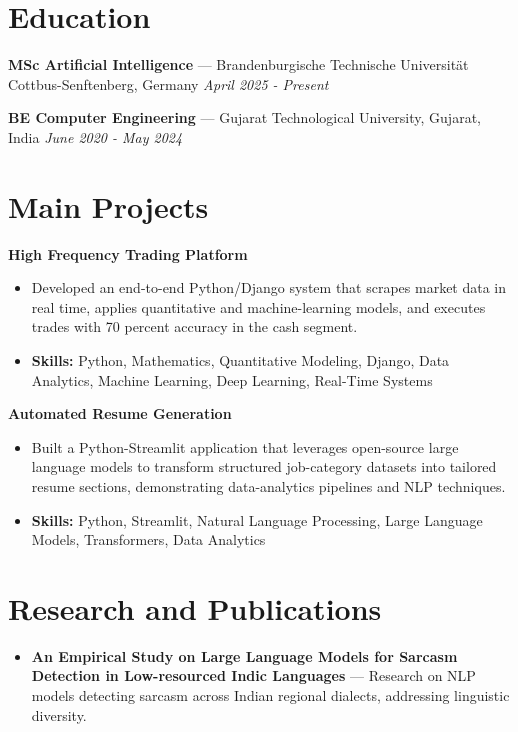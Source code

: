 \documentclass[a4paper,10pt]{article}
\begin{document}
\section*{Education}
\textbf{MSc Artificial Intelligence} — Brandenburgische Technische Universität Cottbus-Senftenberg, Germany \hfill \textit{April 2025 - Present}\par
\vspace{1.5pt}
\textbf{BE Computer Engineering} — Gujarat Technological University, Gujarat, India \hfill \textit{June 2020 - May 2024}\par

\section*{Main Projects}
\textbf{High Frequency Trading Platform}\par
\vspace{1pt}
\begin{itemize}
  \item Developed an end-to-end Python/Django system that scrapes market data in real time, applies quantitative and machine-learning models, and executes trades with 70 percent accuracy in the cash segment.
  \item \textbf{Skills:} Python, Mathematics, Quantitative Modeling, Django, Data Analytics, Machine Learning, Deep Learning, Real-Time Systems
\end{itemize}
\vspace{3pt}
\textbf{Automated Resume Generation}\par
\vspace{1pt}
\begin{itemize}
  \item Built a Python-Streamlit application that leverages open-source large language models to transform structured job-category datasets into tailored resume sections, demonstrating data-analytics pipelines and NLP techniques.
  \item \textbf{Skills:} Python, Streamlit, Natural Language Processing, Large Language Models, Transformers, Data Analytics
\end{itemize}

\section*{Research and Publications}
\begin{itemize}
\item \textbf{An Empirical Study on Large Language Models for Sarcasm Detection in Low-resourced Indic Languages} — Research on NLP models detecting sarcasm across Indian regional dialects, addressing linguistic diversity.
\end{itemize}
\end{document}
